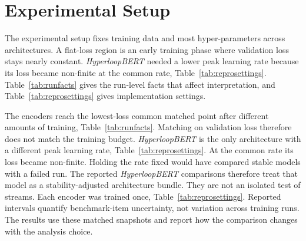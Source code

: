 \documentclass[sigconf,natbib=true,anonymous=true]{acmart}
\begin{document}
\section{Experimental Setup}
\label{sec:setup}

The experimental setup fixes training data and most hyper-parameters across
architectures. A flat-loss region is an early training phase where validation
loss stays nearly constant. \emph{HyperloopBERT} needed a lower peak learning
rate because its loss became non-finite at the common rate,
Table~\ref{tab:reprosettings}. Table~\ref{tab:runfacts} gives the run-level
facts that affect interpretation, and Table~\ref{tab:reprosettings} gives
implementation settings.

The encoders reach the lowest-loss common matched point after different amounts
of training, Table~\ref{tab:runfacts}. Matching on validation loss therefore
does not match the training budget. \emph{HyperloopBERT} is the only architecture
with a different peak learning rate, Table~\ref{tab:reprosettings}. At the
common rate its loss became non-finite. Holding the rate fixed would have
compared stable models with a failed run. The reported \emph{HyperloopBERT}
comparisons therefore treat that model as a stability-adjusted architecture
bundle. They are not an isolated test of streams. Each encoder was trained once,
Table~\ref{tab:reprosettings}. Reported intervals quantify benchmark-item
uncertainty, not variation across training runs. The results use these matched
snapshots and report how the comparison changes with the analysis choice.
\end{document}
